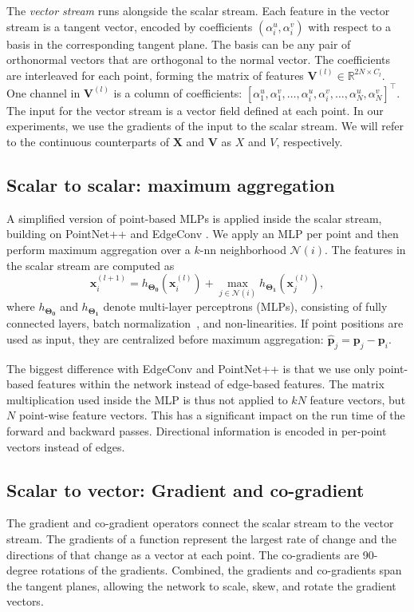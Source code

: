 \documentclass[acmtog, authorversion]{acmart}
\begin{document}
The \textit{vector stream} runs alongside the scalar stream. Each feature in the vector stream is a tangent vector, encoded by coefficients $(\alpha_i^u, \alpha_i^v)$ with respect to a basis in the corresponding tangent plane.
The basis can be any pair of orthonormal vectors that are orthogonal to the normal vector.
The coefficients are interleaved for each point, forming the matrix of features $\mathbf{V}^{(l)} \in \mathbb{R}^{2N \times C_l}$. One channel in $\mathbf{V}^{(l)}$ is a column of coefficients: $[ \alpha_1^u, \alpha_1^v, \ldots, \alpha_i^u, \alpha_i^v, \ldots, \alpha_N^u, \alpha_N^v ]^\intercal$. The input for the vector stream is a vector field defined at each point. In our experiments, we use the gradients of the input to the scalar stream. We will refer to the continuous counterparts of $\mathbf{X}$ and $\mathbf{V}$ as $X$ and $V$, respectively.

\subsection{Scalar to scalar: maximum aggregation}
A simplified version of point-based MLPs is applied inside the scalar stream, building on PointNet++ \cite{Qi2017b} and EdgeConv \cite{Wang2019}. We apply an MLP per point and then perform maximum aggregation over a $k$-nn neighborhood $\mathcal{N}(i)$. The features in the scalar stream are computed as
\begin{equation}
\mathbf{x}^{(l+1)}_i = h_{\mathbf{\Theta_0}}(\mathbf{x}^{(l)}_i) + \max_{j \in \mathcal{N}(i)}
h_{\mathbf{\Theta_1}}(\mathbf{x}^{(l)}_j),
\label{eq:scalarbase}
\end{equation}
where $h_{\mathbf{\Theta_0}}$ and $h_{\mathbf{\Theta_1}}$ denote multi-layer perceptrons (MLPs), consisting of fully connected layers, batch normalization~\cite{Ioffe2015}, and non-linearities. If point positions are used as input, they are centralized before maximum aggregation: $\mathbf{\hat{p}}_j = \mathbf{p}_j - \mathbf{p}_i$.

The biggest difference with EdgeConv and PointNet++ is that we use only point-based features within the network instead of edge-based features. The matrix multiplication used inside the MLP is thus not applied to $kN$ feature vectors, but $N$ point-wise feature vectors. This has a significant impact on the run time of the forward and backward passes. Directional information is encoded in per-point vectors instead of edges.

\subsection{Scalar to vector: Gradient and co-gradient}
The gradient and co-gradient operators connect the scalar stream to the vector stream. The gradients of a function represent the largest rate of change and the directions of that change as a vector at each point.
The co-gradients are 90-degree rotations of the gradients. Combined, the gradients and co-gradients span the tangent planes, allowing the network to scale, skew, and rotate the gradient vectors.
\end{document}
